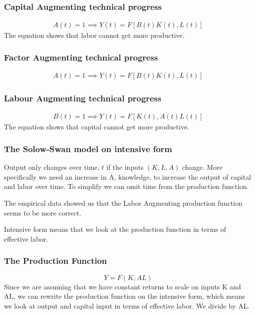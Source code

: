 \subsubsection*{Capital Augmenting technical progress}
\begin{align}
A(t) = 1 \implies Y(t)=F\left[B(t)K(t),L(t)\right]
\end{align}
The equation shows that labor cannot get more productive. 

\subsubsection*{Factor Augmenting technical progress}
\begin{align}
A(t) = 1 \implies Y(t)=F\left[B(t)K(t),L(t)\right]
\end{align}

\subsubsection*{Labour Augmenting technical progress}
\begin{align}
B(t) = 1 \implies Y(t)=F\left[K(t),A(t)L(t)\right]
\end{align}
The equation shows that capital cannot get more productive. 

\subsubsection{The Solow-Swan model on intensive form}
Output only changes over time, $t$ if the inputs $(K, L, A)$ change. More specifically we need an increase in A, knowledge, to increase the output of capital and labor over time.
To simplify we can omit time from the production function. 


The empirical data showed us that the Labor Augmenting production function seems to be more correct.

Intensive form means that we look at the production function in terms of effective labor. 
\subsubsection*{The Production Function}
\begin{equation}
Y=F(K,AL)
\end{equation}
Since we are assuming that we have constant returns to scale on inputs K and AL, we can rewrite the production function on the intensive form, which means we look at output and capital input in terms of effective labor. We divide by AL.

